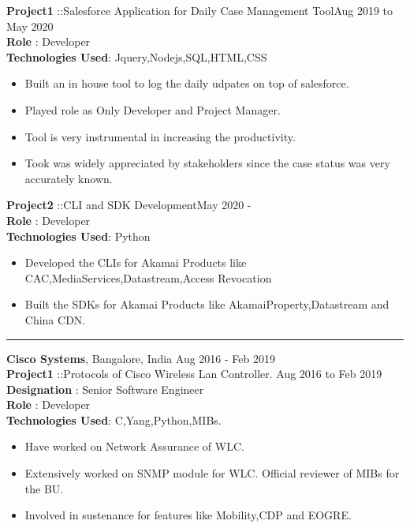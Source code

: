 \documentclass{resumeclass}
\begin{document}
\begin{resume}
  
  \textbf{Project1} ::Salesforce Application for Daily Case Management Tool\hfill      Aug 2019 to May 2020 \\
  \textbf{Role} : Developer \\
  \textbf{Technologies Used}: Jquery,Nodejs,SQL,HTML,CSS
  
   \begin{itemize} \itemsep -2pt
    \item Built an in house tool to log the daily udpates on top of salesforce. 
    \item Played role as Only Developer and Project Manager. 
    \item Tool is very instrumental in increasing the productivity.
    \item Took was widely appreciated by stakeholders since the case status was very accurately known.
  \end{itemize} \vspace{-6pt}

  \textbf{Project2} ::CLI and SDK Development\hfill      May 2020 - \\
  \textbf{Role} : Developer \\
  \textbf{Technologies Used}: Python
  
   \begin{itemize} \itemsep -2pt
    \item Developed the CLIs for Akamai Products like CAC,MediaServices,Datastream,Access Revocation
    \item Built the SDKs for Akamai Products like AkamaiProperty,Datastream and China CDN.
  \end{itemize} \vspace{-6pt}

\hfill   
\noindent\rule{20cm}{0.4pt}

{\large \textbf{Cisco Systems}, Bangalore, India} \hfill        Aug 2016 - Feb 2019 \\[0.5pt]

\textbf{Project1} ::Protocols of Cisco Wireless Lan Controller. \hfill      Aug 2016 to Feb 2019 \\
\textbf{Designation} : Senior Software Engineer \\
\textbf{Role} : Developer \\
\textbf{Technologies Used}: C,Yang,Python,MIBs.

 \begin{itemize} \itemsep -2pt
  \item Have worked on Network Assurance of WLC.
  \item Extensively worked on SNMP module for WLC. Official reviewer of MIBs for the BU.
  \item Involved in sustenance for features like Mobility,CDP and EOGRE.
\end{itemize} \vspace{-6pt}



\end{resume}
\end{document}
